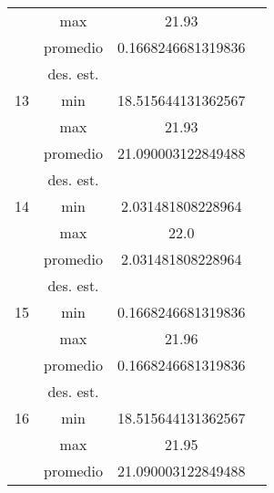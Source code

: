 \documentclass{report}
\begin{document}
\begin{table}[ht]
\begin{tabular}{|c|c|c|c|}
                              & max                         &       21.93     &        \\ \cline{2-4} 
                              & promedio                    &      0.1668246681319836      &        \\ \cline{2-4} 
                              & des. est.                   &            &        \\ \hline
        13                    & min                         &       18.515644131362567     &        \\ \cline{2-4} 
                              & max                         &     21.93       &        \\ \cline{2-4} 
                              & promedio                    &    21.090003122849488        &        \\ \cline{2-4} 
                              & des. est.                   &            &        \\ \hline
        14                    & min                         &      2.031481808228964      &        \\ \cline{2-4} 
                              & max                         &     22.0       &        \\ \cline{2-4} 
                              & promedio                    &     2.031481808228964       &        \\ \cline{2-4} 
                              & des. est.                   &            &        \\ \hline
        15                    & min                         &     0.1668246681319836       &        \\ \cline{2-4} 
                              & max                         &      21.96      &        \\ \cline{2-4} 
                              & promedio                    &      0.1668246681319836      &        \\ \cline{2-4} 
                              & des. est.                   &            &        \\ \hline
        16                    & min                         &      18.515644131362567      &        \\ \cline{2-4} 
                              & max                         &       21.95     &        \\ \cline{2-4} 
                              & promedio                    &     21.090003122849488       &        \\ \cline{2-4} 

\end{tabular}
\end{table}
\end{document}
